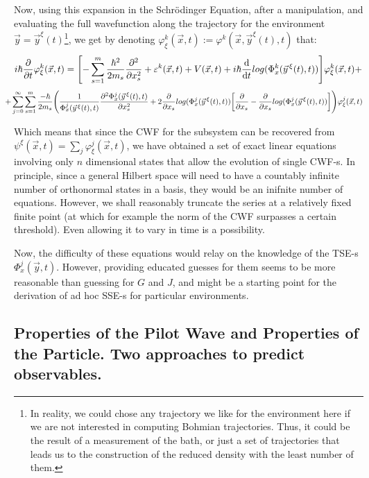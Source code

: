 \documentclass[11pt, a4paper]{article} %
\begin{document}
Now, using this expansion in the Schrödinger Equation, after a manipulation, and evaluating the full wavefunction along the trajectory for the environment $\vec{y}=\vec{y}^\xi(t)$\footnote{In reality, we could chose any trajectory we like for the environment here if we are not interested in computing Bohmian trajectories. Thus, it could be the result of a measurement of the bath, or just a set of trajectories that leads us to the construction of the reduced density with the least number of them.}, we get by denoting $\varphi^k_\xi(\vec{x},t):=\varphi^k(\vec{x},\vec{y}^\xi(t),t)$ that:
\begin{equation}
 i\hbar\pdv{}{t}\varphi^k_\xi(\vec{x},t)=\qty[-\sum_{s=1}^m\frac{\hbar^2}{2m_s}\pdv[2]{}{x_s}+ \varepsilon^k(\vec{x},t)+V(\vec{x},t)   +i\hbar \dv{}{t}log(\Phi^k_x(\vec{y}^{\, \xi}(t),t))]\varphi^k_\xi(\vec{x},t)+
\end{equation}
$$
\hspace{-0.4cm}+\sum_{j=0}^\infty\sum_{s=1}^m \frac{-\hbar}{2m_s}\qty( \frac{1}{\Phi^j_x(\vec{y}^{\, \xi}(t),t)}\pdv[2]{\Phi^j_x(\vec{y}^{\, \xi}(t),t)}{x_s}+2\pdv{}{x_s}log(\Phi^j_x(\vec{y}^{\, \xi}(t),t))\qty[\pdv{}{x_s}-\pdv{}{x_s}log(\Phi^j_x(\vec{y}^{\, \xi}(t),t))] )\varphi^j_\xi(\vec{x},t)
$$

Which means that since the CWF for the subsystem can be recovered from $\psi^\xi(\vec{x},t)=\sum_j \varphi^j_\xi(\vec{x},t)$, we have obtained a set of exact linear equations involving only $n$ dimensional states that allow the evolution of single CWF-s. In principle, since a general Hilbert space will need to have a countably infinite number of orthonormal states in a basis, they would be an inifnite number of equations. However, we shall reasonably truncate the series at a relatively fixed finite point (at which for example the norm of the CWF surpasses a certain threshold). Even allowing it to vary in time is a possibility.

Now, the difficulty of these equations would relay on the knowledge of the TSE-s $\Phi^j_x(\vec{y},t)$. However, providing educated guesses for them seems to be more reasonable than guessing for $G$ and $J$, and might be a starting point for the derivation of ad hoc SSE-s for particular environments.  

 
\subsection*{Properties of the Pilot Wave and Properties of the Particle. Two approaches to predict observables.}
\end{document}
